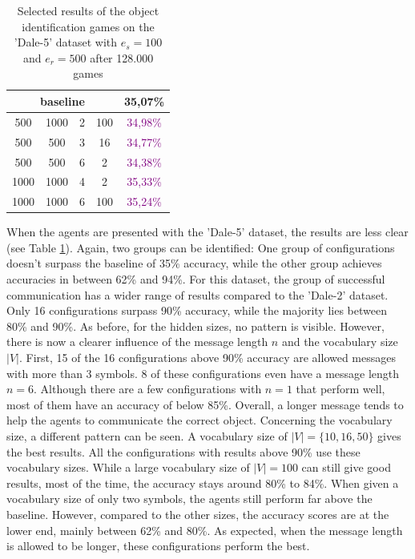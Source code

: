 \begin{table}[ht]
\begin{tabular}{cccc|c}
        \multicolumn{4}{c|}{baseline} & {35,07\%}                                                     \\\midrule
        {500}                         & {1000}    & {2} & {100} & \textcolor{purple}{34,98\%}         \\
        {500}                         & {500}     & {3} & {16}  & \textcolor{purple}{34,77\%}         \\
        {500}                         & {500}     & {6} & {2}   & \textcolor{purple}{34,38\%}         \\
        {1000}                        & {1000}    & {4} & {2}   & \textcolor{purple}{35,33\%}         \\
        {1000}                        & {1000}    & {6} & {100} & \textcolor{purple}{35,24\%}         \\
        \bottomrule
    \end{tabular}
    \caption{Selected results of the object identification games on the 'Dale-5' dataset with $e_s=100$ and $e_r=500$ after 128.000 games}
    \label{tab:results_discriminator_dale-5}
\end{table}

When the agents are presented with the 'Dale-5' dataset, the results are less clear (see Table \ref{tab:results_discriminator_dale-5}).
Again, two groups can be identified: One group of configurations doesn't surpass the baseline of 35\% accuracy, while the other group achieves accuracies in between 62\% and 94\%.
For this dataset, the group of successful communication has a wider range of results compared to the 'Dale-2' dataset.
Only 16 configurations surpass 90\% accuracy, while the majority lies between 80\% and 90\%.
As before, for the hidden sizes, no pattern is visible.
However, there is now a clearer influence of the message length $n$ and the vocabulary size $|V|$.
First, 15 of the 16 configurations above 90\% accuracy are allowed messages with more than 3 symbols.
8 of these configurations even have a message length $n = 6$.
Although there are a few configurations with $n = 1$ that perform well, most of them have an accuracy of below 85\%.
Overall, a longer message tends to help the agents to communicate the correct object.
Concerning the vocabulary size, a different pattern can be seen.
A vocabulary size of $|V| = \{10,16,50\}$ gives the best results.
All the configurations with results above 90\% use these vocabulary sizes.
While a large vocabulary size of $|V| = 100$ can still give good results, most of the time, the accuracy stays around 80\% to 84\%.
When given a vocabulary size of only two symbols, the agents still perform far above the baseline.
However, compared to the other sizes, the accuracy scores are at the lower end, mainly between 62\% and 80\%.
As expected, when the message length is allowed to be longer, these configurations perform the best.

